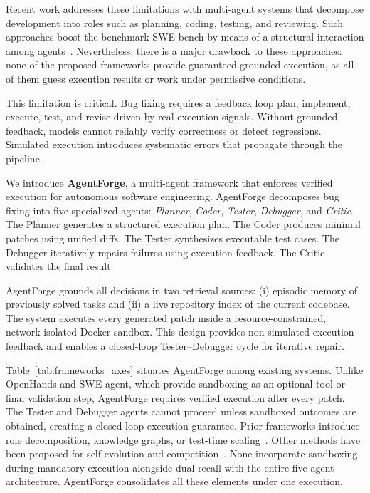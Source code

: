 \documentclass[journal]{IEEEtran}
\begin{document}
Recent work addresses these limitations with multi-agent systems that decompose development into roles such as planning, coding, testing, and reviewing. Such approaches boost the benchmark SWE-bench by means of a structural interaction among agents~\cite{trae2025}. Nevertheless, there is a major drawback to these approaches: none of the proposed frameworks provide guaranteed grounded execution, as all of them guess execution results or work under permissive conditions.


This limitation is critical. Bug fixing requires a feedback loop plan, implement, execute, test, and revise driven by real execution signals. Without grounded feedback, models cannot reliably verify correctness or detect regressions. Simulated execution introduces systematic errors that propagate through the pipeline.


We introduce \textbf{AgentForge}, a multi-agent framework that enforces verified execution for autonomous software engineering. AgentForge decomposes bug fixing into five specialized agents: \textit{Planner}, \textit{Coder}, \textit{Tester}, \textit{Debugger}, and \textit{Critic}. The Planner generates a structured execution plan. The Coder produces minimal patches using unified diffs. The Tester synthesizes executable test cases. The Debugger iteratively repairs failures using execution feedback. The Critic validates the final result.

AgentForge grounds all decisions in two retrieval sources: (i) episodic memory of previously solved tasks and (ii) a live repository index of the current codebase. The system executes every generated patch inside a resource-constrained, network-isolated Docker sandbox. This design provides non-simulated execution feedback and enables a closed-loop Tester--Debugger cycle for iterative repair.

Table~\ref{tab:frameworks_axes} situates AgentForge among existing systems. Unlike OpenHands and SWE-agent, which provide sandboxing as an optional tool or final validation step, AgentForge requires verified execution after every patch. The Tester and Debugger agents cannot proceed unless sandboxed outcomes are obtained, creating a closed-loop execution guarantee. Prior frameworks introduce role decomposition, knowledge graphs, or test-time scaling~\cite{khanzadeh2025agentmesh,tao2024magis,sgagent2026,trae2025}. Other methods have been proposed for self-evolution and competition~\cite{ecoevolve2026,swedebate2026}. None incorporate sandboxing during mandatory execution alongside dual recall with the entire five-agent architecture. AgentForge consolidates all these elements under one execution.
\end{document}
